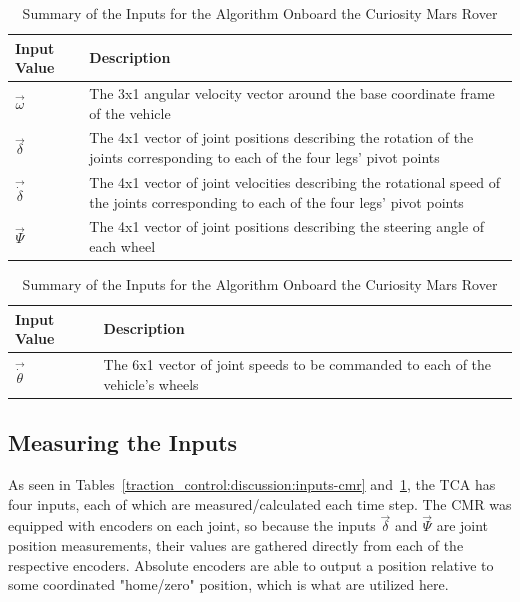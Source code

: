\begin{table}[H]
	\centering
	\begin{tabular}{| >{\centering\arraybackslash} m{1.2in} | >{\centering\arraybackslash} m{4.5in} |}
		\hline
		\textbf{Input Value} & \textbf{Description} \\
		\hline
		$\vec{\omega}$ & The 3x1 angular velocity vector around the base coordinate frame of the vehicle \\
		\hline
		$\vec{\delta}$ & The 4x1 vector of joint positions describing the rotation of the joints corresponding to each of the four legs' pivot points \\
		\hline
		$\vec{\dot{\delta}}$ & The 4x1 vector of joint velocities describing the rotational speed of the joints corresponding to each of the four legs' pivot points \\
		\hline
		$\vec{\Psi}$ & The 4x1 vector of joint positions describing the steering angle of each wheel \\
		\hline
	\end{tabular}
	\caption{Summary of the Inputs for the Algorithm Onboard the Curiosity Mars Rover}
	\label{traction_control:discussion:inputs-srr}
\end{table}

\begin{table}[H]
	\centering
	\begin{tabular}{| >{\centering\arraybackslash} m{1.2in} | >{\centering\arraybackslash} m{4.5in} |}
		\hline
		\textbf{Input Value} & \textbf{Description} \\
		\hline
		$\vec{\dot{\theta}}$ & The 6x1 vector of joint speeds to be commanded to each of the vehicle's wheels \\
		\hline
	\end{tabular}
	\caption{Summary of the Inputs for the Algorithm Onboard the Curiosity Mars Rover}
	\label{traction_control:discussion:outputs-srr}
\end{table}

\subsection{Measuring the Inputs}

As seen in Tables~\ref{traction_control:discussion:inputs-cmr} and~\ref{traction_control:discussion:inputs-srr}, the \ac{TCA} has four inputs, each of which are measured/calculated each time step. The \ac{CMR} was equipped with encoders on each joint, so because the inputs $\vec{\delta}$ and $\vec{\Psi}$ are joint position measurements, their values are gathered directly from each of the respective encoders. Absolute encoders are able to output a position relative to some coordinated "home/zero" position, which is what are utilized here. \\

